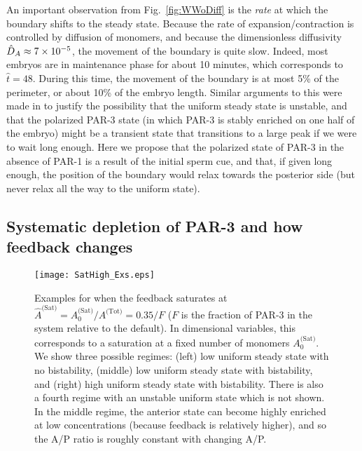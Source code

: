 \documentclass[11pt]{article}
\newcommand{\6}[1]{#1_{\text{6}}}
\newcommand{\3}[1]{#1_{\text{3}}}
\newcommand{\Tot}[1]{#1^\text{(Tot)}}
\newcommand{\Sat}[1]{#1^\text{(Sat)}}
\begin{document}
An important observation from Fig.\ \ref{fig:WWoDiff} is the \emph{rate} at which the boundary shifts to the steady state. Because the rate of expansion/contraction is controlled by diffusion of monomers, and because the dimensionless diffusivity $\hat{D}_A \approx 7 \times 10^{-5}$,  the movement of the boundary is quite slow. Indeed, most embryos are in maintenance phase for about 10 minutes, which corresponds to $\hat t = 48$. During this time, the movement of the boundary is at most 5\% of the perimeter, or about 10\% of the embryo length. Similar arguments to this were made in \cite{lang2022oligomerization} to justify the possibility that the uniform steady state is unstable, and that the polarized PAR-3 state (in which PAR-3 is stably enriched on one half of the embryo) \cite{lang2023oligomerization} might be a transient state that transitions to a large peak if we were to wait long enough. Here we propose that the polarized state of PAR-3 in the absence of PAR-1 is a result of the initial sperm cue, and that, if given long enough, the position of the boundary would relax towards the posterior side (but never relax all the way to the uniform state).


\subsection{Systematic depletion of PAR-3 and how feedback changes \label{sec:howFB}}
\begin{figure}
\centering
\texttt{[image: SatHigh\_Exs.eps]}
\caption{\label{fig:SatHighEx}Examples for when the feedback saturates at $\Sat{\hat A}=\Sat{A}_0/\Tot{A}=0.35/F$ ($F$ is the fraction of PAR-3 in the system relative to the default). In dimensional variables, this corresponds to a saturation at a fixed number of monomers $\Sat{A}_0$. We show three possible regimes: (left) low uniform steady state with no bistability, (middle) low uniform steady state with bistability, and (right) high uniform steady state with bistability. There is also a fourth regime with an unstable uniform state which is not shown. In the middle regime, the anterior state can become highly enriched at low concentrations (because feedback is relatively higher), and so the A/P ratio is roughly constant with changing A/P.}
\end{figure}
\end{document}
